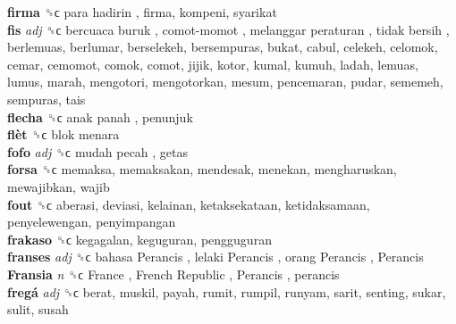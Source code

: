 \textbf{firma} ␝ϲ   para hadirin , firma, kompeni, syarikat  \\
\textbf{fis} \emph{adj}  ␝ϲ   bercuaca buruk ,  comot-momot ,  melanggar peraturan ,  tidak bersih , berlemuas, berlumar, berselekeh, bersempuras, bukat, cabul, celekeh, celomok, cemar, cemomot, comok, comot, jijik, kotor, kumal, kumuh, ladah, lemuas, lumus, marah, mengotori, mengotorkan, mesum, pencemaran, pudar, sememeh, sempuras, tais  \\
\textbf{flecha} ␝ϲ   anak panah , penunjuk  \\
\textbf{flèt} ␝ϲ   blok menara   \\
\textbf{fofo} \emph{adj}  ␝ϲ   mudah pecah , getas  \\
\textbf{forsa} ␝ϲ  memaksa, memaksakan, mendesak, menekan, mengharuskan, mewajibkan, wajib  \\
\textbf{fout} ␝ϲ  aberasi, deviasi, kelainan, ketaksekataan, ketidaksamaan, penyelewengan, penyimpangan  \\
\textbf{frakaso} ␝ϲ  kegagalan, keguguran, pengguguran  \\
\textbf{franses} \emph{adj}  ␝ϲ   bahasa Perancis ,  lelaki Perancis ,  orang Perancis ,  Perancis   \\
\textbf{Fransia} \emph{n}  ␝ϲ   France ,  French Republic ,  Perancis , perancis  \\
\textbf{fregá} \emph{adj}  ␝ϲ  berat, muskil, payah, rumit, rumpil, runyam, sarit, senting, sukar, sulit, susah  \\
